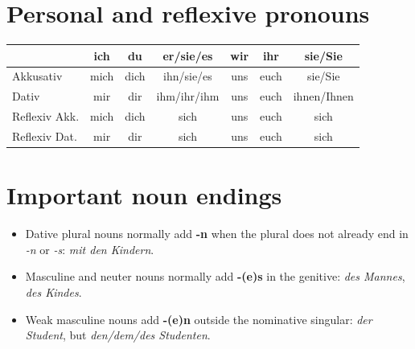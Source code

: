 \section{Personal and reflexive pronouns}

\begin{center}
\begin{tabular}{@{}lcccccc@{}}
\toprule
 & ich & du & er/sie/es & wir & ihr & sie/Sie \\
\midrule
\rowcolor{caseAccusativeBg}
Akkusativ & mich & dich & ihn/sie/es & uns & euch & sie/Sie \\
\rowcolor{caseDativeBg}
Dativ & mir & dir & ihm/ihr/ihm & uns & euch & ihnen/Ihnen \\
\rowcolor{caseAccusativeBg}
Reflexiv Akk. & mich & dich & sich & uns & euch & sich \\
\rowcolor{caseDativeBg}
Reflexiv Dat. & mir & dir & sich & uns & euch & sich \\
\bottomrule
\end{tabular}
\end{center}

\section{Important noun endings}

\begin{itemize}[leftmargin=*]
  \item Dative plural nouns normally add \textbf{-n} when the plural does not
        already end in \textit{-n} or \textit{-s}: \textit{mit den Kindern}.
  \item Masculine and neuter nouns normally add \textbf{-(e)s} in the genitive:
        \textit{des Mannes}, \textit{des Kindes}.
  \item Weak masculine nouns add \textbf{-(e)n} outside the nominative singular:
        \textit{der Student}, but \textit{den/dem/des Studenten}.
\end{itemize}
